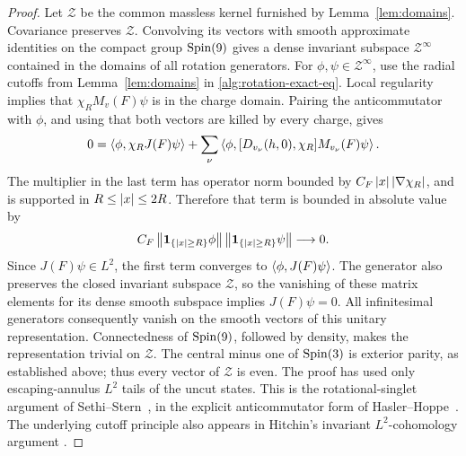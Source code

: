 \begin{proof}
Let \(\mathcal Z\) be the common massless kernel furnished by
Lemma~\ref{lem:domains}. Covariance preserves \(\mathcal Z\).
Convolving its vectors with smooth approximate identities on the
compact group \(\operatorname{Spin}(9)\) gives a dense invariant subspace
\(\mathcal Z^\infty\) contained in the domains of all rotation
generators. For \(\phi,\psi\in\mathcal Z^\infty\), use the radial
cutoffs from Lemma~\ref{lem:domains} in
\eqref{alg:rotation-exact-eq}. Local regularity implies that
\(\chi_RM_v(F)\psi\) is in the charge domain. Pairing the
anticommutator with \(\phi\), and using that both vectors are killed
by every charge, gives
\[
 0=\left\langle \phi,\chi_RJ(F)\psi\right\rangle
   +\sum_\nu\left\langle \phi,[D_{v_\nu}(h,0),\chi_R]M_{v_\nu}(F)\psi\right\rangle.
\]
The multiplier in the last term has operator norm bounded by
\(C_F\left\lvert x\right\rvert\left\lvert \nabla\chi_R\right\rvert\), and is supported in
\(R\leq\left\lvert x\right\rvert\leq2R\). Therefore that term is bounded in absolute
value by
\[
 C_F\left\lVert \mathbf1_{\{\left\lvert x\right\rvert\geq R\}}\phi\right\rVert
       \left\lVert \mathbf1_{\{\left\lvert x\right\rvert\geq R\}}\psi\right\rVert\longrightarrow0.
\]
Since \(J(F)\psi\in L^2\), the first term converges to
\(\left\langle \phi,J(F)\psi\right\rangle\). The generator also preserves the closed
invariant subspace \(\mathcal Z\), so the vanishing of these matrix
elements for its dense smooth subspace implies \(J(F)\psi=0\).
All infinitesimal generators consequently vanish on the smooth
vectors of this unitary representation. Connectedness of
\(\operatorname{Spin}(9)\), followed by density, makes the representation trivial
on \(\mathcal Z\). The central minus one of \(\operatorname{Spin}(3)\) is exterior
parity, as established above; thus every vector of \(\mathcal Z\)
is even. The proof has used only escaping-annulus \(L^2\) tails of
the uncut states. This is the rotational-singlet argument of
Sethi--Stern~\cite{SethiStern2000}, in the explicit anticommutator form
of Hasler--Hoppe~\cite{HaslerHoppe2002}. The underlying cutoff principle
also appears in Hitchin's invariant $L^2$-cohomology argument
\cite[Theorem~3]{Hitchin2000}.
\end{proof}
